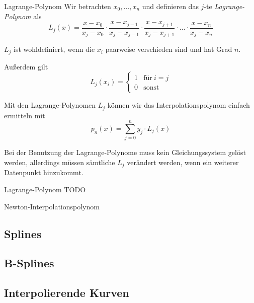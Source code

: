 \begin{defi}{Lagrange-Polynom}
    Wir betrachten $x_0, \ldots, x_n$ und definieren das $j$-te \emph{Lagrange-Polynom} als 
    \[ 
    L_j(x) = \frac{x - x_0}{x_j - x_0} \cdot \frac{x - x_{j-1}}{x_j - x_{j-1}} \cdot \frac{x - x_{j+1}}{x_j - x_{j+1}} \cdot \ldots \cdot \frac{x - x_n}{x_j - x_n}
    \] 
    
    $L_j$ ist wohldefiniert, wenn die $x_i$ paarweise verschieden sind und hat Grad $n$.

    Außerdem gilt 
    \[
        L_j(x_i) = 
        \begin{cases}
            1 & \text{für} \ i = j \\ 
            0 & \text{sonst}
        \end{cases}    
    \]

    Mit den Lagrange-Polynomen $L_j$ können wir das Interpolationspolynom einfach ermitteln mit 
    \[
        p_n(x) = \sum_{j = 0}^{n} y_j \cdot L_j(x)    
    \]

    Bei der Benutzung der Lagrange-Polynome muss kein Gleichungssystem gelöst werden, allerdings müssen sämtliche $L_j$ verändert werden, wenn ein weiterer Datenpunkt hinzukommt.
\end{defi}

\begin{example}{Lagrange-Polynom}
    TODO
\end{example}

\begin{defi}{Newton-Interpolationspolynom}

\end{defi}

\subsection{Splines}

\subsection{B-Splines}

\subsection{Interpolierende Kurven}     